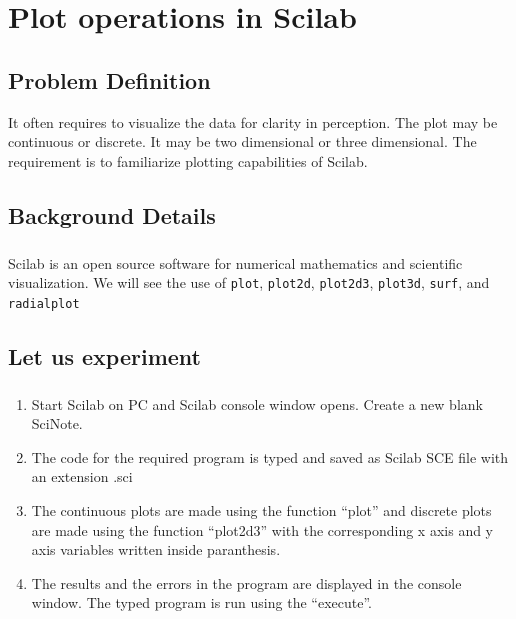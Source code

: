 \chapter [Plot operations in Scilab]{Plot operations in Scilab}


\section*{Problem Definition}
It often requires to visualize the data for clarity in perception. The plot may be continuous or discrete. It may be two dimensional or three dimensional. The requirement is to familiarize plotting capabilities of Scilab.

\section*{Background Details}
\paragraph{}

Scilab is an open source software for numerical mathematics and scientific visualization. We will see the use of \texttt{plot}, \texttt{plot2d}, \texttt{plot2d3}, \texttt{plot3d}, \texttt{surf},  and \texttt{radialplot}

\section*{Let us experiment}

\paragraph{}
\begin{enumerate}
\item
Start Scilab on PC and Scilab console window opens. Create a new blank SciNote.
\item
The code for the required program is typed and saved as Scilab SCE file with an extension .sci

\item

The continuous plots are made using the function “plot” and discrete plots are made using the function “plot2d3” with the corresponding x axis and y axis variables written inside paranthesis.


\item
The results and the errors in the program are displayed in the console window.
The typed program is run using the “execute”.
\end{enumerate}

